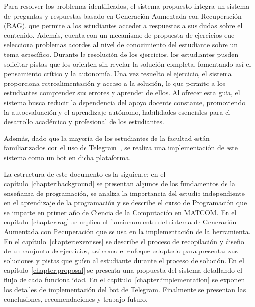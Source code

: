 Para resolver los problemas identificados, el sistema propuesto integra un sistema de preguntas y respuestas basado en Generación Aumentada con Recuperación (RAG), que permite a los estudiantes acceder a respuestas a sus dudas sobre el contenido. Además, cuenta con un mecanismo de propuesta de ejercicios que selecciona problemas acordes al nivel de conocimiento del estudiante sobre un tema específico. Durante la resolución de los ejercicios, los estudiantes pueden solicitar pistas que los orienten sin revelar la solución completa, fomentando así el pensamiento crítico y la autonomía. Una vez resuelto el ejercicio, el sistema proporciona retroalimentación y acceso a la solución, lo que permite a los estudiantes comprender sus errores y aprender de ellos. Al ofrecer esta guía, el sistema busca reducir la dependencia del apoyo docente constante, promoviendo la autoevaluación y el aprendizaje autónomo, habilidades esenciales para el desarrollo académico y profesional de los estudiantes.

Además, dado que la mayoría de los estudiantes de la facultad están familiarizados con el uso de Telegram~\cite{Telegram}, se realiza una implementación de este sistema como un bot en dicha plataforma.

La estructura de este documento es la siguiente: en el capítulo~\ref{chapter:background} se presentan algunos de los fundamentos de la enseñanza de programación, se analiza la importancia del estudio independiente en el aprendizaje de la programación y se describe el curso de Programación que se imparte en primer año de Ciencia de la Computación en \mbox{MATCOM}. En el capítulo~\ref{chapter:rag} se explica el funcionamiento del sistema de Generación Aumentada con Recuperación que se usa en la implementación de la herramienta. En el capítulo~\ref{chapter:exercises} se describe el proceso de recopilación y diseño de un conjunto de ejercicios, así como el enfoque adoptado para presentar sus soluciones y pistas que guíen al estudiante durante el proceso de solución. En el capítulo~\ref{chapter:proposal} se presenta una propuesta del sistema detallando el flujo de cada funcionalidad. En el capítulo~\ref{chapter:implementation} se exponen los detalles de implementación del bot de Telegram. Finalmente se presentan las conclusiones, recomendaciones y trabajo futuro.
